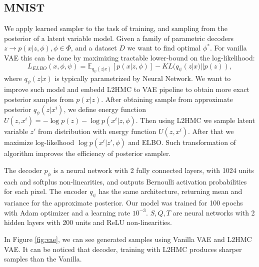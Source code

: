 \documentclass{article}
\begin{document}
\subsection*{MNIST}
We apply learned sampler to the task of training, and sampling from the posterior of a latent  variable model. Given a family of parametric decoders {$z \rightarrow p(x|z, \phi), \phi \in \Phi$}, and a dataset $D$ we want to find optimal $\phi^*$. For vanilla VAE this can be done by maximizing tractable lower-bound on the log-likelihood:
$$L_{ELBO}(x,\phi, \psi) = \mathbb{E}_{q_{\psi}(z|x)}\left[p(x|z,\phi)\right]-KL(q_{\psi}(z|x)||p(z)),$$
where $q_{\psi}(z|x)$ is typically parametrized by Neural Network. We want to improve such model and embedd L2HMC to VAE pipeline to obtain more exact posterior samples from  $p(x|z)$. After obtaining sample from approximate posterior $q_{\psi}(z|x^i)$, we define energy function $U(z, x^i) = -\log p(z)-\log p(x^i|z, \phi)$. Then using L2HMC we sample latent variable $z'$ from 
distribution with energy function $U(z, x^i)$. After that we maximize log-likelhood $\log p(x^i|z', \phi)$ and ELBO. Such transformation of algorithm improves the efficiency of posterior sampler.

The decoder $p_{\phi}$ is a neural network with 2 fully connected layers, with 1024 units each and softplus non-linearities, and outputs Bernoulli activation probabilities for each pixel. The encoder  $q_{\psi}$ has the same architecture, returning mean and variance for the approximate posterior. Our model was trained for 100 epochs with Adam optimizer and a learning rate $10^{-3}$. $S, Q, T$ are neural networks with 2 hidden layers with 200 units and ReLU non-linearities.

In Figure \ref{fig:vae}, we can see generated samples using Vanilla VAE and L2HMC VAE. It can be noticed that decoder, training with L2HMC produces sharper samples than the Vanilla. 
\end{document}
